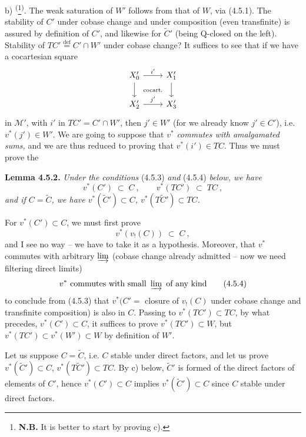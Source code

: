 \documentclass[11pt]{article}
\newcommand{\printedpage}[1]{\marginpar{\footnotesize p.~#1}}
\newcommand{\msp}[1]{\marginpar{\footnotesize [#1]}}
\newcommand{\defeq}{\overset{\text{def}}{=}}
\begin{document}
b) \textsuperscript{(}\footnote[19]{\textbf{N.B.} It is better to start by proving c).}\textsuperscript{)}. The weak saturation of $W'$ follows from that of $W$, via (4.5.1). The stability of $C'$ under cobase change and under composition (even transfinite) is assured by definition of $C'$, and likewise for $\tilde{C}'$ (being Q-closed on the left). Stability of $TC' \defeq C'{\cap}W'$ under cobase change? It suffices to see that if we have a cocartesian square
\[
\begin{tikzcd}
X'_0 \arrow[r, "i'"] \arrow[d] \arrow[dr, phantom, "\text{\scriptsize cocart.}"] & X'_1 \arrow[d] \\
X'_2 \arrow[r, "j'"] & X'_3
\end{tikzcd}
\]
in $\mathcal{M}'$, with $i'$ in $TC' = C' \cap W'$, then $j' \in W'$ (for we already know $j' \in C'$), i.e.
\marginpar{$||$}%
$v^*(j') \in W'$. We are going to suppose that $v^*$ \textit{commutes with amalgamated sums,} and we are thus reduced to proving that $v^*(i') \in TC$. Thus %
\printedpage{37}
\msp{page 76}
we must prove the

\textbf{Lemma 4.5.2.} \textit{Under the conditions} (4.5.3) \textit{and} (4.5.4) \textit{below, we have}
\[
v^*(C') \;\subset\; C\ , \qquad v^*(TC') \;\subset\; TC\ ,
\]
\textit{and if $C = \tilde{C}$, we have $v^*(\tilde{C}') \subset C$, $v^*(T\tilde{C}') \subset TC$.}

For $v^*(C') \subset C$, we must first prove
\[
v^*(v_!(C)) \;\subset\; C\ , \tag*{(4.5.3)}
\]
and I see no way -- we have to take it as a hypothesis. Moreover, that $v^*$ commutes with arbitrary $\varinjlim$ (cobase change already admitted -- now we need filtering direct limits)
\[
v^* \text{ commutes with small } \varinjlim \text{ of any kind} \tag*{(4.5.4)}
\]
to conclude from (4.5.3) that $v^*(C' =$ closure of $v_!(C)$ under cobase change and transfinite composition) is also in $C$. Passing to $v^*(TC') \subset TC$, by what precedes, $v^*(C') \subset C$, it suffices to prove $v^*(TC') \subset W$, but $v^*(TC') \subset v^*(W') \subset W$ by definition of $W'$.

Let us suppose $C = \tilde{C}$, i.e. $C$ stable under direct factors, and let us prove $v^*(\tilde{C}') \subset C$, $v^*(T\tilde{C}') \subset TC$. By c) below, $\tilde{C}'$ is formed of the direct factors
\msp{page 77}
of elements of $C'$, hence $v^*(C') \subset C$ implies $v^*(\tilde{C}') \subset C$ since $C$ stable under direct factors.
\end{document}
